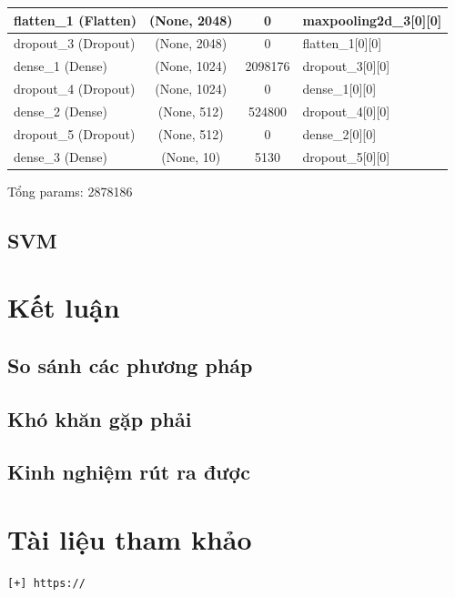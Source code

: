 \documentclass[a4paper,12pt]{report}
\begin{document}
{\begin{center}
\begin{longtable}{lccl}
\hline
flatten\_1 (Flatten)        &      (None, 2048) &         0    &       maxpooling2d\_3[0][0]    \\        

\hline
dropout\_3 (Dropout)    &          (None, 2048)  &        0   &        flatten\_1[0][0]    \\              

\hline
dense\_1 (Dense)      &            (None, 1024)     &     2098176   &  dropout\_3[0][0]    \\              

\hline
dropout\_4 (Dropout)  &            (None, 1024)  &        0  &         dense\_1[0][0]      \\              
\hline
dense\_2 (Dense)       &           (None, 512)  &         524800&      dropout\_4[0][0]        \\          

\hline
dropout\_5 (Dropout)    &          (None, 512) &          0      &     dense\_2[0][0]        \\           

\hline
dense\_3 (Dense)         &         (None, 10) &           5130    &    dropout\_5[0][0]          \\        

\hline
\end{longtable} 
\end{center}
}
Tổng params: 2878186
\section{SVM}
\chapter{Kết luận}
\section{So sánh các phương pháp}
\section{Khó khăn gặp phải}
\section{Kinh nghiệm rút ra được}
\chapter{Tài liệu tham khảo}
\begin{verbatim}
[+] https://

\end{verbatim}
\end{document}
